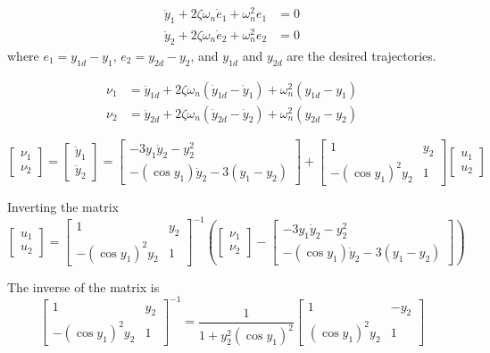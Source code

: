 \documentclass{article}
\begin{document}
\begin{align}
\ddot{y}_1 + 2\zeta\omega_n \dot{e}_1 + \omega_n^2 e_1 &= 0 \\
\ddot{y}_2 + 2\zeta\omega_n \dot{e}_2 + \omega_n^2 e_2 &= 0
\end{align}
where $e_1 = y_{1d} - y_1$, $e_2 = y_{2d} - y_2$, and $y_{1d}$ and $y_{2d}$ are the desired trajectories.

\begin{align}
\nu_1 &= \ddot{y}_{1d} + 2\zeta\omega_n (\dot{y}_{1d} - \dot{y}_1) + \omega_n^2 (y_{1d} - y_1) \\
\nu_2 &= \ddot{y}_{2d} + 2\zeta\omega_n (\dot{y}_{2d} - \dot{y}_2) + \omega_n^2 (y_{2d} - y_2)
\end{align}

\[
\begin{bmatrix} \nu_1 \\ \nu_2 \end{bmatrix} = \begin{bmatrix} \ddot{y}_1 \\ \ddot{y}_2 \end{bmatrix} = \begin{bmatrix} -3y_1\dot{y}_2 - y_2^2 \\ -(\cos y_1)\dot{y}_2 - 3(y_1 - y_2) \end{bmatrix} + \begin{bmatrix} 1 & y_2 \\ -(\cos y_1)^2 y_2 & 1 \end{bmatrix} \begin{bmatrix} u_1 \\ u_2 \end{bmatrix}
\]

Inverting the matrix
\[
\begin{bmatrix} u_1 \\ u_2 \end{bmatrix} = \begin{bmatrix} 1 & y_2 \\ -(\cos y_1)^2 y_2 & 1 \end{bmatrix}^{-1} \left( \begin{bmatrix} \nu_1 \\ \nu_2 \end{bmatrix} - \begin{bmatrix} -3y_1\dot{y}_2 - y_2^2 \\ -(\cos y_1)\dot{y}_2 - 3(y_1 - y_2) \end{bmatrix} \right)
\]

The inverse of the matrix is
\[
\begin{bmatrix} 1 & y_2 \\ -(\cos y_1)^2 y_2 & 1 \end{bmatrix}^{-1} = \frac{1}{1 + y_2^2 (\cos y_1)^2} \begin{bmatrix} 1 & -y_2 \\ (\cos y_1)^2 y_2 & 1 \end{bmatrix}
\]
\end{document}
